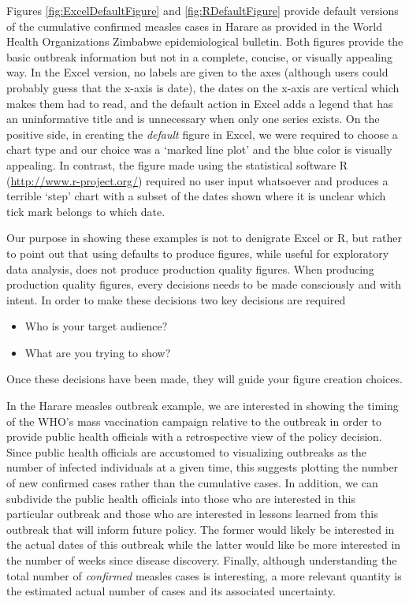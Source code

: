 \documentclass{article}
\begin{document}
Figures \ref{fig:ExcelDefaultFigure} and \ref{fig:RDefaultFigure} provide default versions of the cumulative confirmed measles cases in Harare as provided in the World Health Organizations Zimbabwe epidemiological bulletin. Both figures provide the basic outbreak information but not in a complete, concise, or visually appealing way. In the Excel version, no labels are given to the axes (although users could probably guess that the x-axis is date), the dates on the x-axis are vertical which makes them had to read, and the default action in Excel adds a legend that has an uninformative title and is unnecessary when only one series exists. On the positive side, in creating the \emph{default} figure in Excel, we were required to choose a chart type and our choice was a `marked line plot' and the blue color is visually appealing. In contrast, the figure made using the statistical software R (\url{http://www.r-project.org/}) required no user input whatsoever and produces a terrible `step' chart with a subset of the dates shown where it is unclear which tick mark belongs to which date.

Our purpose in showing these examples is not to denigrate Excel or R, but rather to point out that using defaults to produce figures, while useful for exploratory data analysis, does not produce production quality figures.  When producing production quality figures, every decisions needs to be made consciously and with intent. In order to make these decisions two key decisions are required
\begin{itemize}
\item Who is your target audience?
\item What are you trying to show?
\end{itemize}
Once these decisions have been made, they will guide your figure creation choices.

In the Harare measles outbreak example, we are interested in showing the timing of the WHO's mass vaccination campaign relative to the outbreak in order to provide public health officials with a retrospective view of the policy decision. Since public health officials are accustomed to visualizing outbreaks as the number of infected individuals at a given time, this suggests plotting the number of new confirmed cases rather than the cumulative cases. In addition, we can subdivide the public health officials into those who are interested in this particular outbreak and those who are interested in lessons learned from this outbreak that will inform future policy. The former would likely be interested in the actual dates of this outbreak while the latter would like be more interested in the number of weeks since disease discovery. Finally, although understanding the total number of \emph{confirmed} measles cases is interesting, a more relevant quantity is the estimated actual number of cases and its associated uncertainty.
\end{document}

